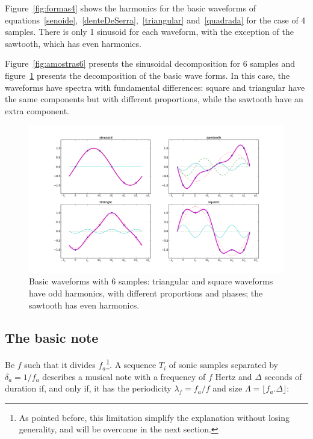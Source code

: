 \documentclass[
 aip,
 jmp,
 amsmath,amssymb,
 reprint,
]{revtex4-1}
\begin{document}
Figure~\ref{fig:formas4} shows the harmonics for the basic waveforms of equations~\ref{senoide},~\ref{denteDeSerra},~\ref{triangular} and~\ref{quadrada} for the case of 4 samples. There is only 1 sinusoid for each waveform, with the exception of the sawtooth, which has even harmonics.

Figure~\ref{fig:amostras6} presents the sinusoidal decomposition for 6 samples and figure~\ref{fig:formas6} presents the decomposition of the basic wave forms.
In this case, the waveforms have spectra with fundamental differences: square and triangular have the same components but with different proportions, while the sawtooth have an extra component.

\begin{figure}[h!]
    \centering
        \includegraphics[width=\columnwidth]{figures/amostras6formas__}
    \caption{Basic waveforms with 6 samples: triangular and square waveforms have odd harmonics, with different proportions and phases; the sawtooth has even harmonics.}
        \label{fig:formas6}
\end{figure}

\subsection{The basic note}\label{notaBasica}

Be $f$ such that it divides $f_a$\footnote{As pointed before, this limitation simplify the explanation without losing generality, and will be overcome in the next section.}. A sequence $T_i$ of sonic samples separated by $\delta_a=1/f_a$ describes a musical note with a frequency of $f$ Hertz and $\Delta$ seconds of duration if, and only if, it has the periodicity $\lambda_f=f_a/f$ and size $\Lambda=\lfloor f_a . \Delta \rfloor $:
\end{document}
